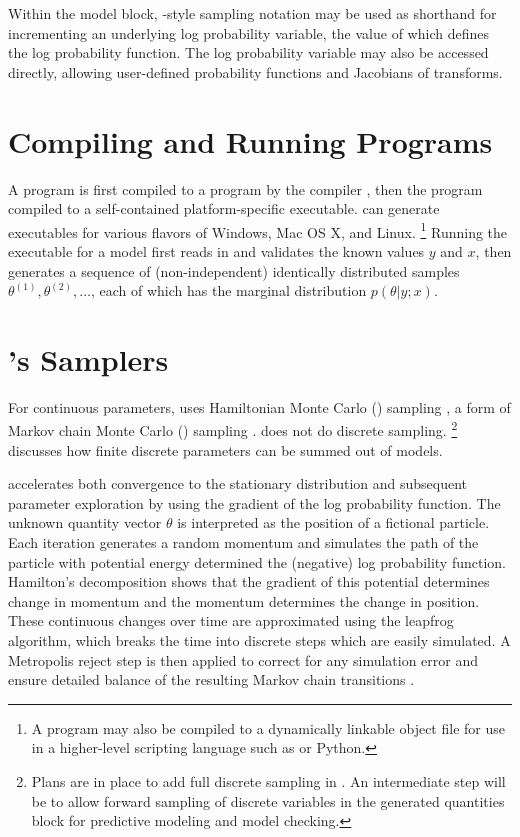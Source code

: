Within the model block, \BUGS-style sampling notation may be used as
shorthand for incrementing an underlying log probability variable, the
value of which defines the log probability function.  The log
probability variable may also be accessed directly, allowing
user-defined probability functions and Jacobians of transforms.


\section{Compiling and Running \Stan Programs}

A \Stan program is first compiled to a \Cpp program by the \Stan
compiler \stanc, then the \Cpp program compiled to a self-contained
platform-specific executable.  \Stan can generate executables for
various flavors of Windows, Mac OS X, and Linux.%
%
\footnote{A \Stan program may also be compiled to a dynamically
  linkable object file for use in a higher-level scripting language
  such as \R or Python.}
%
Running the \Stan executable for a model first reads in and validates
the known values $y$ and $x$, then generates a sequence of
(non-independent) identically distributed samples $\theta^{(1)},
\theta^{(2)}, \ldots$, each of which has the marginal distribution
$p(\theta|y;x)$.


\section{\Stan's Samplers}

For continuous parameters, \Stan uses Hamiltonian Monte Carlo (\HMC)
sampling \citep{Duane:1987, Neal:1994, Neal:2011}, a form of Markov chain Monte
Carlo (\MCMC) sampling \citep{Metropolis:1953}.   does not do
discrete sampling.%
%
\footnote{Plans are in place to add full discrete sampling in .  An intermediate step will be to allow forward sampling of
  discrete variables in the generated quantities block for predictive
  modeling and model checking.}
%
 discusses how finite discrete parameters
can be summed out of models.

\HMC accelerates both convergence to the stationary distribution and
subsequent parameter exploration by using the gradient of the log
probability function.  The unknown quantity vector $\theta$ is
interpreted as the position of a fictional particle.  Each iteration
generates a random momentum and simulates the path of the particle
with potential energy determined the (negative) log probability
function.  Hamilton's decomposition shows that the gradient of this
potential determines change in momentum and the momentum determines
the change in position.  These continuous changes over time are
approximated using the leapfrog algorithm, which breaks the time into
discrete steps which are easily simulated.  A Metropolis reject step
is then applied to correct for any simulation error and ensure
detailed balance of the resulting Markov chain transitions
\citep{Metropolis:1953, Hastings:1970}.


